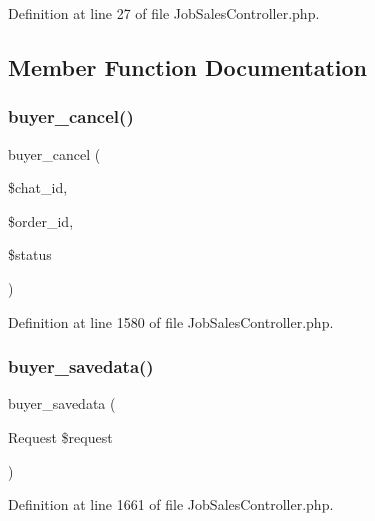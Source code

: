 Definition at line 27 of file Job\+Sales\+Controller.\+php.



\subsection{Member Function Documentation}
\mbox{\label{class_responsive_1_1_http_1_1_controllers_1_1_job_sales_controller_ae6476cb9150ea64e6ace4db49772bdd3}} 
\subsubsection{\texorpdfstring{buyer\_cancel()}{buyer\_cancel()}}
{\footnotesize\ttfamily buyer\+\_\+cancel (\begin{DoxyParamCaption}\item[{}]{\$chat\+\_\+id,  }\item[{}]{\$order\+\_\+id,  }\item[{}]{\$status }\end{DoxyParamCaption})}



Definition at line 1580 of file Job\+Sales\+Controller.\+php.

\mbox{\label{class_responsive_1_1_http_1_1_controllers_1_1_job_sales_controller_acaa311945d5dcb4df3f670f1a719cae7}} 
\subsubsection{\texorpdfstring{buyer\_savedata()}{buyer\_savedata()}}
{\footnotesize\ttfamily buyer\+\_\+savedata (\begin{DoxyParamCaption}\item[{Request}]{\$request }\end{DoxyParamCaption})\hspace{0.3cm}{\ttfamily [protected]}}



Definition at line 1661 of file Job\+Sales\+Controller.\+php.

